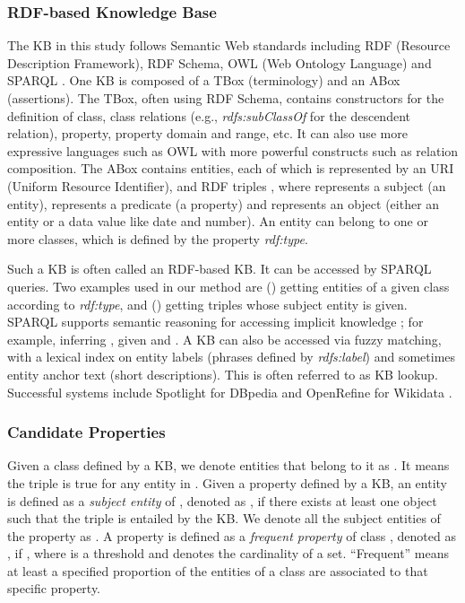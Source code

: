 \documentclass{article}
\begin{document}
\subsubsection{RDF-based Knowledge Base}
The KB in this study follows Semantic Web standards including RDF (Resource Description Framework), RDF Schema, OWL (Web Ontology Language) and SPARQL \cite{domingue2011handbook}.
One KB is composed of a TBox (terminology) and an ABox (assertions).
The TBox, often using RDF Schema, contains constructors for
the definition of class,
class relations (e.g., \textit{rdfs:subClassOf} for the descendent relation),
property,
property domain and range, etc.
It can also use more expressive languages such as OWL with 
more powerful constructs such as relation composition.
The ABox contains entities, each of which is represented by an URI (Uniform Resource Identifier),
and RDF triples 
,
where  represents a subject (an entity), 
 represents a predicate (a property) 
and  represents an object
(either an entity or a data value like date and number).
An entity can belong to
one or more classes, which is defined by the property \textit{rdf:type}. 

Such a KB is often called an RDF-based KB. 
It can be accessed by SPARQL queries.
Two examples used in our method are () getting entities of a given class according to \textit{rdf:type},
and () getting triples whose subject entity is given.
SPARQL supports semantic reasoning for accessing implicit knowledge \cite{glimm2012sparql};
for example, inferring ,
given  and .
A KB can also be accessed via fuzzy matching,
with a lexical index on entity labels (phrases defined by \textit{rdfs:label}) and sometimes entity anchor text (short descriptions).
This is often referred to as KB lookup.
Successful systems include Spotlight for DBpedia \cite{mendes2011dbpedia} and  OpenRefine for Wikidata \cite{ham2013openrefine}.

\subsubsection{Candidate Properties}
Given a class  defined by a KB,
we denote entities that belong to it as .
It means the triple  is true 
for any entity  in .
Given a property  defined by a KB,
an entity is defined as a \textit{subject entity} of , denoted as , 
if there exists at least one object  such that the triple  is entailed by the KB.
We denote all the subject entities of the property  as .
A property is defined as a \textit{frequent property} of class , denoted as ,
if ,
where  is a threshold and  denotes the cardinality of a set.
``Frequent'' means at least a specified proportion of the entities of a class are associated to that specific property.
\end{document}
